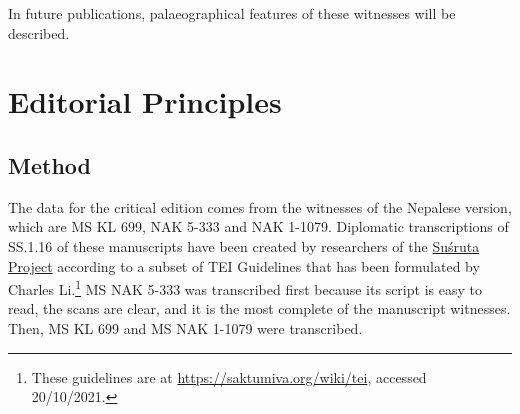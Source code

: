 In future publications, palaeographical features of these 
witnesses will be described.


\section{Editorial Principles}
\subsection{Method}
The data for the critical edition comes from the witnesses of the Nepalese version, 
which are MS KL 699, NAK 5-333 and NAK 1-1079. Diplomatic transcriptions of 
SS.1.16 of these manuscripts have been created by researchers of the 
\href{https://sushrutaproject.org}{Suśruta 
Project}\space%
according to a subset of TEI Guidelines that has been formulated by Charles 
Li.\footnote{These guidelines are at \url{https://saktumiva.org/wiki/tei}, accessed 
20/10/2021.} MS NAK 5-333 was transcribed first because its script is easy to 
read, the scans are clear, and it is the most complete of the manuscript 
witnesses. Then, MS KL 699 and MS NAK 1-1079 were transcribed. 

